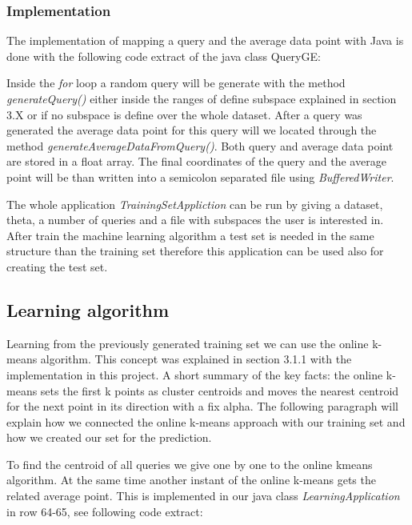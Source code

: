 \documentclass{lmproj}
\begin{document}
\subsubsection{Implementation}

The implementation of mapping a query and the average data point with Java is done with the following code extract of the java class QueryGE:



Inside the \textit{for} loop a random query will be generate with the method \textit{generateQuery()} either inside the ranges of define subspace explained in section 3.X or if no subspace is define over the whole dataset. After a query was generated the average data point for this query will we located through the method \textit{generateAverageDataFromQuery()}. Both query and average data point are stored in a float array. The final coordinates of the query and the average point will be than written into a semicolon separated file using \textit{BufferedWriter}.

The whole application \textit{TrainingSetAppliction} can be run by giving a dataset, theta, a number of queries and a file with subspaces the user is interested in.
After train the machine learning algorithm a test set is needed in the same structure than the training set therefore this application can be used also for creating the test set. 


\subsection{Learning algorithm}

Learning from the previously generated training set we can use the online k-means algorithm. This concept was explained in section 3.1.1 with the implementation in this project. 
A short summary of the key facts: the online k-means sets the first k points as cluster centroids and moves the nearest centroid for the next point in its direction with a fix alpha. 
The following paragraph will explain how we connected the online k-means approach with our training set and how we created our set for the prediction.

To find the centroid of all queries we give one by one to the online kmeans algorithm. At the same time another instant of the online k-means gets the related average point. This is implemented in our java class \textit{LearningApplication} in row 64-65, see following code extract:
\end{document}
